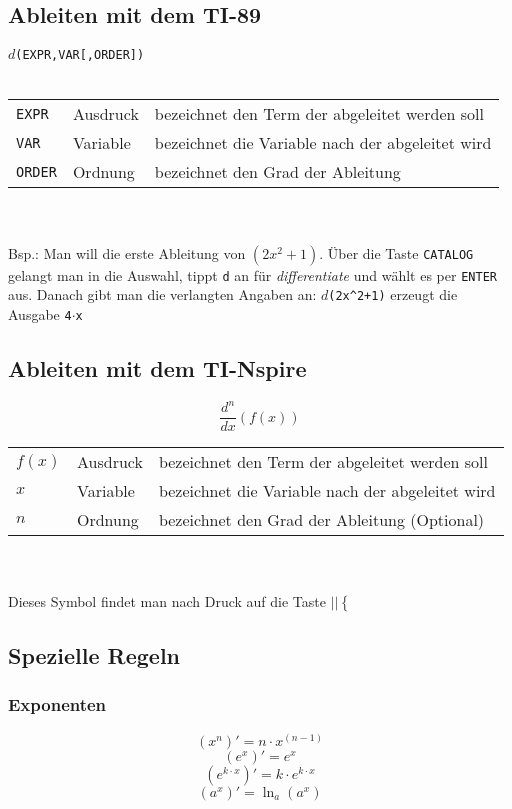 \subsection{Ableiten mit dem TI-89}
$d$\verb?(EXPR,VAR[,ORDER])?\\\\
\begin{tabular}{@{}lll}
\verb?EXPR?	& Ausdruck	& bezeichnet den Term der abgeleitet werden soll \\
\verb?VAR?	& Variable	& bezeichnet die Variable nach der abgeleitet wird \\
\verb?ORDER?	& Ordnung	& bezeichnet den Grad der Ableitung \\
\end{tabular}\\\\
Bsp.: Man will die erste Ableitung von $(2x^2 + 1)$. Über die Taste \verb?CATALOG? gelangt man in die Auswahl, tippt \verb?d? an für \textit{differentiate} und wählt es per \verb?ENTER? aus. Danach gibt man die verlangten Angaben an: $d$\verb?(2x^2+1)? erzeugt die Ausgabe \verb?4?$\cdot$\verb?x?
\fi
\ifnspire
\subsection{Ableiten mit dem TI-Nspire}
\[ \frac{d^{\boxed{n}}}{d\boxed{x}}\left(\boxed{f(x)}\right) \]
\begin{tabular}{@{}lll}
$f(x)$	& Ausdruck	& bezeichnet den Term der abgeleitet werden soll \\
$x$	& Variable	& bezeichnet die Variable nach der abgeleitet wird \\
$n$	& Ordnung	& bezeichnet den Grad der Ableitung (Optional) \\
\end{tabular}\\\\
Dieses Symbol findet man nach Druck auf die Taste $\boxed{\boxed{|\boxed{}|\left\{\frac{\boxed{}}{\boxed{}}\right.}}$
\fi

\subsection{Spezielle Regeln}

\subsubsection{Exponenten}
\[ \boxed{ (x^n)' = n\cdot x^{(n-1)} } \]
\[ \boxed{ (e^x)' = e^x } \]
\[ \boxed{ (e^{k\cdot x})' = k \cdot e^{k\cdot x} } \]
\[ \boxed{ (a^x)' = \ln_a (a^x) } \]

